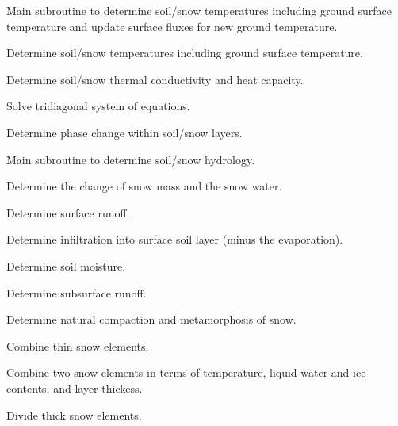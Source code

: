 \documentclass[]{article}
\begin{document}
Main subroutine to determine soil/snow temperatures including ground
surface temperature and update surface fluxes for new ground
temperature. \newline

Determine soil/snow temperatures including ground surface
temperature. \newline

Determine soil/snow thermal conductivity and heat capacity. \newline

Solve tridiagonal system of equations. \newline

Determine phase change within soil/snow layers. \newline

Main subroutine to determine soil/snow hydrology. \newline

Determine the change of snow mass and the snow water. \newline

Determine surface runoff. \newline

Determine infiltration into surface soil layer (minus the
evaporation). \newline

Determine soil moisture. \newline

Determine subsurface runoff. \newline

Determine natural compaction and metamorphosis of snow. \newline

Combine thin snow elements. \newline

Combine two snow elements in terms of temperature, liquid water and
ice contents, and layer thickess. \newline

Divide thick snow elements. \newline
\end{document}
